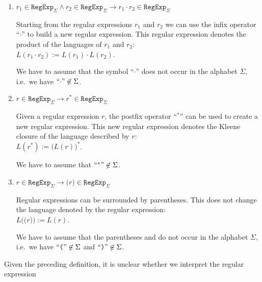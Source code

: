 \begin{Definition}
\begin{enumerate}
        We have to assume that the symbol  ``\texttt{+}'' does not occur in the alphabet $\Sigma$, i.e.~we have  $\squoted{+} \not\in \Sigma$.
  \item $r_1 \in \texttt{RegExp}_\Sigma \wedge r_2 \in \texttt{RegExp}_\Sigma 
         \rightarrow r_1 \cdot r_2 \in \texttt{RegExp}_\Sigma$

        Starting from the regular expressions $r_1$ and $r_2$ we can use the  infix operator
        ``$\cdot$'' to build a new regular expression.  This regular expression denotes
        the product of the languages of $r_1$ and $r_2$:
        \\[0.2cm]
        \hspace*{1.3cm}
        $L(r_1 \cdot r_2) := L(r_1) \cdot L(r_2)$.

        We have to assume that the symbol ``$\cdot$'' does not occur in the alphabet $\Sigma$, i.e.~we have $\mbox{``\texttt{$\cdot$}''} \not\in \Sigma$.
  \item $r \in \texttt{RegExp}_\Sigma \rightarrow r^* \in \texttt{RegExp}_\Sigma$

        Given a regular expression $r$, the postfix operator
        ``$^*$'' can be used to create a new regular expression.  This new regular expression
        denotes the Kleene closure of the language described by  $r$:
        \\[0.2cm]
        \hspace*{1.3cm}
        $L(r^*) := \bigl(L(r)\bigr)^*$.

        We have to assume that $\mbox{``\texttt{$^*$}''} \not\in \Sigma$. 
  \item $r \in \texttt{RegExp}_\Sigma \rightarrow \texttt{(}r\texttt{)} \in \texttt{RegExp}_\Sigma$

        Regular expressions can be surrounded by parentheses.  This does not change the language
        denoted by the regular expression:
        \\[0.2cm]
        \hspace*{1.3cm}
        $L\bigl(\texttt{(}r\texttt{)}\bigr) := L(r)$. 

        We have to assume that the parentheses  \qote{(} and \qote{)} do not occur
        in the alphabet $\Sigma$, i.e.~we have $\mbox{``\texttt{(}''} \not\in \Sigma$  and $\mbox{``\texttt{)}''} \not\in \Sigma$. \eox
  \end{enumerate}
\end{Definition}
Given the preceding definition, it is unclear whether we interpret the regular expression
\\[0.2cm]
